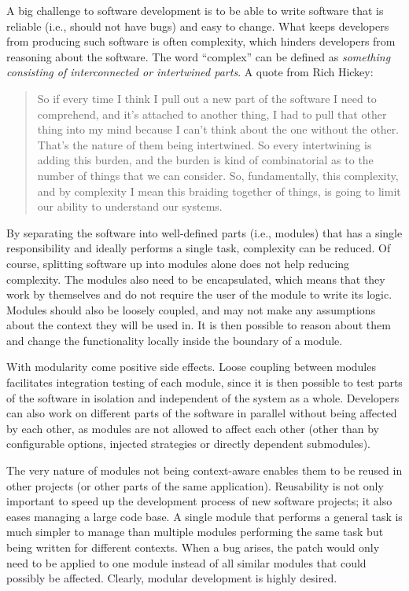 \documentclass[a4paper,11pt]{kth-mag}
\begin{document}
        A big challenge to software development is to be able to write software that is reliable (i.e., should not have bugs) and easy to change.
        What keeps developers from producing such software is often complexity, which hinders developers from reasoning about the software.
        The word ``complex'' can be defined as \emph{something consisting of interconnected or intertwined parts}.
        A quote from Rich Hickey:
        \begin{quote}
          So if every time I think I pull out a new part of the software I need to comprehend, and it's attached to another thing, I had to pull that other thing into my mind because I can't think about the one without the other.
          That's the nature of them being intertwined. So every intertwining is adding this burden, and the burden is kind of combinatorial as to the number of things that we can consider.
          So, fundamentally, this complexity, and by complexity I mean this braiding together of things, is going to limit our ability to understand our systems.
        \end{quote}
        By separating the software into well-defined parts (i.e., modules) that has a single responsibility and ideally performs a single task, complexity can be reduced.
        Of course, splitting software up into modules alone does not help reducing complexity.
        The modules also need to be \gls{encapsulated}, which means that they work by themselves and do not require the user of the module to write its logic.
        Modules should also be loosely coupled, and may not make any assumptions about the context they will be used in.
        It is then possible to reason about them and change the functionality locally inside the boundary of a module.
        
        With modularity come positive side effects.
        Loose coupling between modules facilitates integration testing of each module, since it is then possible to test parts of the software in isolation and independent of the system as a whole.
        Developers can also work on different parts of the software in parallel without being affected by each other, as modules are not allowed to affect each other (other than by configurable options, injected strategies or directly dependent submodules).
        
        The very nature of modules not being context-aware enables them to be reused in other projects (or other parts of the same application).
        Reusability is not only important to speed up the development process of new software projects; it also eases managing a large code base.
        A single module that performs a general task is much simpler to manage than multiple modules performing the same task but being written for different contexts.
        When a bug arises, the patch would only need to be applied to one module instead of all similar modules that could possibly be affected.
        Clearly, modular development is highly desired.
\end{document}
